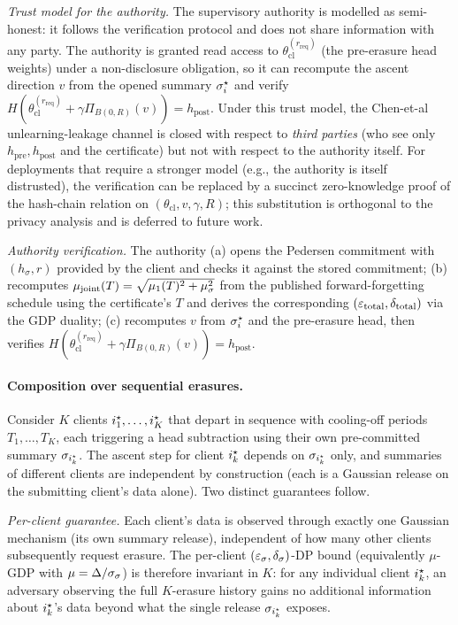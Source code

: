 \textit{Trust model for the authority.} The supervisory authority is modelled as
semi-honest: it follows the verification protocol and does not share information
with any party. The authority is granted read access to
$\theta_\mathrm{cl}^{(r_\mathrm{req})}$ (the pre-erasure head weights) under a
non-disclosure obligation, so it can recompute the ascent direction $v$ from the
opened summary $\sigma_i^{\star}$ and verify
$H(\theta_\mathrm{cl}^{(r_\mathrm{req})} + \gamma \Pi_{B(0,R)}(v)) = h_\mathrm{post}$.
Under this trust model, the Chen-et-al unlearning-leakage channel
\cite{chen2021unlearningleaks} is closed with respect to \emph{third parties}
(who see only $h_\mathrm{pre}, h_\mathrm{post}$ and the certificate) but not with
respect to the authority itself. For deployments that require a stronger model
(e.g., the authority is itself distrusted), the verification can be replaced by a
succinct zero-knowledge proof of the hash-chain relation on
$(\theta_\mathrm{cl}, v, \gamma, R)$; this substitution is orthogonal to the
privacy analysis and is deferred to future work.

\textit{Authority verification.} The authority (a) opens the Pedersen commitment
with $(h_\sigma, r)$ provided by the client and checks it against the stored
commitment; (b) recomputes $\mu_\mathrm{joint}(T) = \sqrt{\mu_1(T)^2 + \mu_\sigma^2}$
from the published forward-forgetting schedule using the certificate's $T$ and
derives the corresponding $(\varepsilon_\mathrm{total}, \delta_\mathrm{total})$ via the GDP
duality; (c) recomputes $v$ from $\sigma_i^{\star}$ and the pre-erasure head, then
verifies $H(\theta_\mathrm{cl}^{(r_\mathrm{req})} + \gamma \Pi_{B(0,R)}(v)) =
h_\mathrm{post}$.

\paragraph{Composition over sequential erasures.}
Consider $K$ clients $i^{\star}_1, \ldots, i^{\star}_K$ that depart in sequence with
cooling-off periods $T_1, \ldots, T_K$, each triggering a head subtraction using
their own pre-committed summary $\sigma_{i^{\star}_k}$. The ascent step for client
$i^{\star}_k$ depends on $\sigma_{i^{\star}_k}$ only, and summaries of different
clients are independent by construction (each is a Gaussian release on the
submitting client's data alone). Two distinct guarantees follow.

\textit{Per-client guarantee.} Each client's data is observed through exactly one
Gaussian mechanism (its own summary release), independent of how many other
clients subsequently request erasure. The per-client $(\varepsilon_\sigma,
\delta_\sigma)$-DP bound (equivalently $\mu$-GDP with $\mu = \Delta/\sigma_\sigma$)
is therefore invariant in $K$: for any individual client $i^{\star}_k$, an adversary
observing the full $K$-erasure history gains no additional information about
$i^{\star}_k$'s data beyond what the single release $\sigma_{i^{\star}_k}$ exposes.

